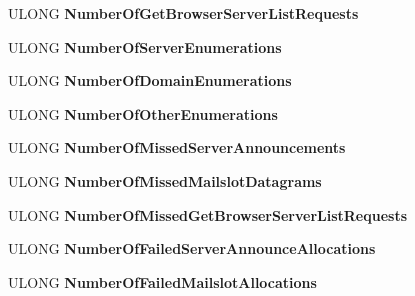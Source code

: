 \begin{DoxyCompactItemize}
U\+L\+O\+NG {\bfseries Number\+Of\+Get\+Browser\+Server\+List\+Requests}
\item 
\mbox{\label{struct___b_r_o_w_s_e_r___s_t_a_t_i_s_t_i_c_s_a3108feb220db6c16fc1cfb290c472899}} 
U\+L\+O\+NG {\bfseries Number\+Of\+Server\+Enumerations}
\item 
\mbox{\label{struct___b_r_o_w_s_e_r___s_t_a_t_i_s_t_i_c_s_a272af260ccf43b312b8026cdc655e1e1}} 
U\+L\+O\+NG {\bfseries Number\+Of\+Domain\+Enumerations}
\item 
\mbox{\label{struct___b_r_o_w_s_e_r___s_t_a_t_i_s_t_i_c_s_ab95069fc78e38bd80ea764324ca386d3}} 
U\+L\+O\+NG {\bfseries Number\+Of\+Other\+Enumerations}
\item 
\mbox{\label{struct___b_r_o_w_s_e_r___s_t_a_t_i_s_t_i_c_s_a169ba58c68155d5cc653c0b935cf87e4}} 
U\+L\+O\+NG {\bfseries Number\+Of\+Missed\+Server\+Announcements}
\item 
\mbox{\label{struct___b_r_o_w_s_e_r___s_t_a_t_i_s_t_i_c_s_a9506ae3074551411a69c7544c5bfd2e2}} 
U\+L\+O\+NG {\bfseries Number\+Of\+Missed\+Mailslot\+Datagrams}
\item 
\mbox{\label{struct___b_r_o_w_s_e_r___s_t_a_t_i_s_t_i_c_s_a7d710ddf12c17990b63eeab9b406ddd0}} 
U\+L\+O\+NG {\bfseries Number\+Of\+Missed\+Get\+Browser\+Server\+List\+Requests}
\item 
\mbox{\label{struct___b_r_o_w_s_e_r___s_t_a_t_i_s_t_i_c_s_a3d4ab3f7253d3ea49e57cd29be70c150}} 
U\+L\+O\+NG {\bfseries Number\+Of\+Failed\+Server\+Announce\+Allocations}
\item 
\mbox{\label{struct___b_r_o_w_s_e_r___s_t_a_t_i_s_t_i_c_s_a67182bf3fe7224203d099dca0d6eec96}} 
U\+L\+O\+NG {\bfseries Number\+Of\+Failed\+Mailslot\+Allocations}
\item 
\mbox{\label{struct___b_r_o_w_s_e_r___s_t_a_t_i_s_t_i_c_s_a6a52884dccbf78d479503d0b9c41c43f}} 

\end{DoxyCompactItemize}
